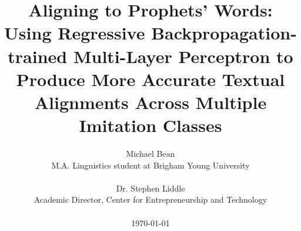 \title{Aligning to Prophets' Words:\\
Using Regressive Backpropagation-trained Multi-Layer Perceptron to Produce More Accurate Textual Alignments Across Multiple Imitation Classes}

\author{Michael Bean\\
M.A. Linguistics student at Brigham Young University\\
\\
Dr. Stephen Liddle\\
Academic Director, Center for Entrepreneurship and Technology\\
\\
\today
}
\maketitle
